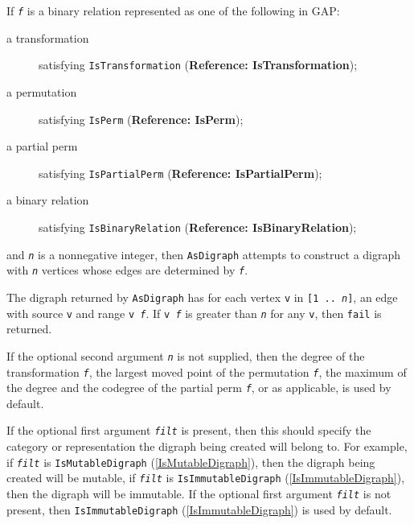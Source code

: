\documentclass[a4paper,11pt]{report}
\begin{document}
{{{ If \mbox{\texttt{\mdseries\slshape f}} is a binary relation represented as one of the following in \textsf{GAP}: 
\begin{description}
\item[{ a transformation }]  satisfying \texttt{IsTransformation} (\textbf{Reference: IsTransformation}); 
\item[{ a permutation }]  satisfying \texttt{IsPerm} (\textbf{Reference: IsPerm}); 
\item[{ a partial perm }]  satisfying \texttt{IsPartialPerm} (\textbf{Reference: IsPartialPerm}); 
\item[{ a binary relation }]  satisfying \texttt{IsBinaryRelation} (\textbf{Reference: IsBinaryRelation}); 
\end{description}
 and \mbox{\texttt{\mdseries\slshape n}} is a non\texttt{}negative integer, then \texttt{AsDigraph} attempts to construct a digraph with \mbox{\texttt{\mdseries\slshape n}} vertices whose edges are determined by \mbox{\texttt{\mdseries\slshape f}}.

 The digraph returned by \texttt{AsDigraph} has for each vertex \texttt{v} in \texttt{[1 .. \mbox{\texttt{\mdseries\slshape n}}]}, an edge with source \texttt{v} and range \texttt{v \texttt{} \mbox{\texttt{\mdseries\slshape f}}}. If \texttt{v \texttt{} \mbox{\texttt{\mdseries\slshape f}}} is greater than \mbox{\texttt{\mdseries\slshape n}} for any \texttt{v}, then \texttt{fail} is returned. 

 If the optional second argument \mbox{\texttt{\mdseries\slshape n}} is not supplied, then the degree of the transformation \mbox{\texttt{\mdseries\slshape f}}, the largest moved point of the permutation \mbox{\texttt{\mdseries\slshape f}}, the maximum of the degree and the codegree of the partial perm \mbox{\texttt{\mdseries\slshape f}}, or as applicable, is used by default. 

 If the optional first argument \mbox{\texttt{\mdseries\slshape filt}} is present, then this should specify the category or representation the
digraph being created will belong to. For example, if \mbox{\texttt{\mdseries\slshape filt}} is \texttt{IsMutableDigraph} (\ref{IsMutableDigraph}), then the digraph being created will be mutable, if \mbox{\texttt{\mdseries\slshape filt}} is \texttt{IsImmutableDigraph} (\ref{IsImmutableDigraph}), then the digraph will be immutable. If the optional first argument \mbox{\texttt{\mdseries\slshape filt}} is not present, then \texttt{IsImmutableDigraph} (\ref{IsImmutableDigraph}) is used by default.

}}}
\end{document}
